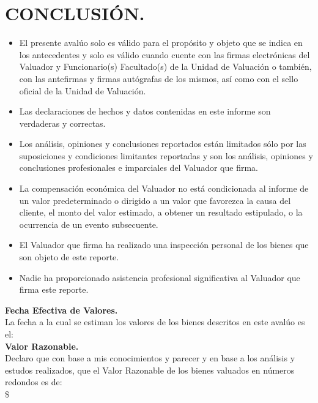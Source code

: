 \chapter{CONCLUSIÓN.} %
\begin{itemize}
	\item El presente avalúo solo es válido para el propósito y objeto que se indica en los antecedentes y solo es válido cuando cuente con las firmas electrónicas del Valuador y Funcionario(s) Facultado(s) de la Unidad de Valuación o también, con las antefirmas y firmas autógrafas de los mismos, así como con el sello oficial de la Unidad de Valuación.
	\item Las declaraciones de hechos y datos contenidas en este informe son verdaderas y correctas.
	\item Los análisis, opiniones y conclusiones reportados están limitados sólo por las suposiciones y condiciones limitantes reportadas y son los análisis, opiniones y conclusiones profesionales e imparciales del Valuador que firma.
	\item La compensación económica del Valuador no está condicionada al informe de un valor predeterminado o dirigido a un valor que favorezca la causa del cliente, el monto del valor estimado, a obtener un resultado estipulado, o la ocurrencia de un evento subsecuente.
	\item El Valuador que firma ha realizado una inspección personal de los bienes que son objeto de este reporte. 
	\item Nadie ha proporcionado asistencia profesional significativa al Valuador que firma este reporte.
\end{itemize}
\textbf{Fecha Efectiva de Valores.} \\ 
La fecha a la cual se estiman los valores de los bienes descritos en este avalúo es el: \hspace{1cm} \fechaInforme \\ 
\textbf{Valor Razonable.} \\ 
Declaro que con base a mis conocimientos y parecer y en base a los análisis y estudos realizados, que el Valor Razonable de los bienes valuados en números redondos es de: \\[1cm]
\hfill 
{\large \$\valorMaquinaria}
\hfill 
{\large \valorMaquinariaLetra}
\hfill
\\ 
